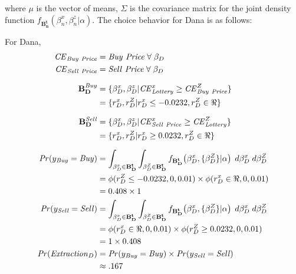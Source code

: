 \addtocounter{footnote}{-1}

\noindent where $\mu$ is the vector of means, $\Sigma$ is the covariance matrix for the joint density function $f_{\mathbf{B_n^t}}(\beta_n^x,\beta_n^z|\alpha)$.
The choice behavior for Dana is as follows:

\noindent For Dana,
\begin{align}
	\begin{split}
		{\ensuremath{\mathit{CE}}}_{\mathit{Buy\ Price}} &= \mathit{Buy\ Price} \;\forall\; \beta_D\\
		{\mathit{CE}}_{\mathit{Sell\ Price}} &= \mathit{Sell\ Price} \;\forall\; \beta_D\\[1.5ex]
		\mathbf{B_D^{\mathit{Buy}}} &= \{ \beta_D^x,\beta_D^z | {\mathit{CE}}_{\mathit{Lottery}}^x \geq {\ensuremath{\mathit{CE}}}_{\mathit{Buy\ Price}}^Z \}\\
		&= \{ r_D^x,r_D^Z | r_D^x \leq -0.0232, r_D^Z \in \Re\}\\[1.5ex]
		\mathbf{B_D^{\mathit{Sell}}} &= \{ \beta_D^x,\beta_D^z | {\mathit{CE}}_{\mathit{Sell\ Price}}^x \geq {\ensuremath{\mathit{CE}}}_{\mathit{Lottery}}^Z \}\\
		&= \{ r_D^x,r_D^Z | r_D^x \geq 0.0232, r_D^Z \in \Re\}\\[1.5ex]
		{\ensuremath{\mathit{Pr}}}(y_{\mathit{Buy}} = \mathit{Buy}) &= \int_{\beta_D^x \in \mathbf{B^t_D}}\int_{\beta_D^Z \in \mathbf{B^t_D}} f_{\mathbf{B^t_D}}\!\left(\beta_D^x,\{\beta_D^Z\}|\alpha\right) \;d\beta_D^x \; d\beta_D^Z\\
		&= \phi(r_D^Z \leq -0.0232,0,0.01) \times \phi(r_D^x \in \Re,0,0.01)\\
		&= 0.408 \times 1\\
		{\mathit{Pr}}(y_{\mathit{Sell}} = \mathit{Sell}) &= \int_{\beta_D^x \in \mathbf{B^t_D}}\int_{\beta_D^Z \in \mathbf{B^t_D}} f_{\mathbf{B^t_D}}\!\left(\beta_D^x,\{\beta_D^Z\}|\alpha\right) \;d\beta_D^x \; d\beta_D^Z\\
		&= \phi(r_D^x \in \Re,0,0.01) \times \phi(r_D^Z \geq 0.0232,0,0.01)\\
		&= 1 \times 0.408\\
	{\mathit{Pr}}(\mathit{Extraction}_D) &= {\mathit{Pr}}(y_{\mathit{Buy}} = \mathit{Buy}) \times {\ensuremath{\mathit{Pr}}}(y_{\mathit{Sell}} = \mathit{Sell})\\
	&\approx .167
	\end{split}
\end{align}

